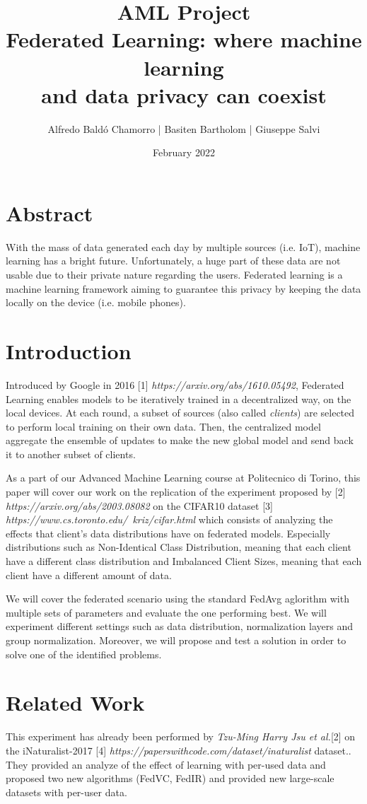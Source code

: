 \documentclass[twocolumn]{article}
\title{AML Project
\\Federated Learning: where machine learning \\and data privacy can coexist
}
\author{
Alfredo Baldó Chamorro | 
Basiten Bartholom |
Giuseppe Salvi
}
\date{February 2022}
\begin{document}
\maketitle

\section{Abstract}
With the mass of data generated each day by multiple sources (i.e. IoT), machine learning has a bright future. Unfortunately, a huge part of these data are not usable due to their private nature regarding the users. Federated learning is a machine learning framework aiming to guarantee this privacy by keeping the data locally on the device (i.e. mobile phones).
\section{Introduction} %

Introduced by Google in 2016 [1] \emph{https://arxiv.org/abs/1610.05492}, Federated Learning enables models to be iteratively trained in a decentralized way, on the local devices. At each round, a subset of sources (also called \emph{clients}) are selected to perform local training on their own data. Then, the centralized model aggregate the ensemble of updates to make the new global model and send back it to another subset of clients. 

As a part of our Advanced Machine Learning course at Politecnico di Torino, this paper will cover our work on the replication of the experiment proposed by [2] \emph{https://arxiv.org/abs/2003.08082} on the CIFAR10 dataset [3] \emph{https://www.cs.toronto.edu/~kriz/cifar.html} which consists of analyzing the effects that client's data distributions have on federated models. Especially distributions such as Non-Identical Class Distribution, meaning that each client have a different class distribution and Imbalanced Client Sizes, meaning that each client have a different amount of data. 

We will cover the federated scenario using the standard FedAvg aglorithm with multiple sets of parameters and evaluate the one performing best. We will experiment different settings such as data distribution, normalization layers and group normalization. Moreover, we will propose and test a solution in order to solve one of the identified problems.

\section{Related Work} %
This experiment has already been performed by \emph{Tzu-Ming Harry Jsu et al.}[2]  on the iNaturalist-2017 [4] \emph{https://paperswithcode.com/dataset/inaturalist} dataset.. They provided an analyze of the effect of learning with per-used data and proposed two new algorithms (FedVC, FedIR) and provided new large-scale datasets with per-user data.
\end{document}
